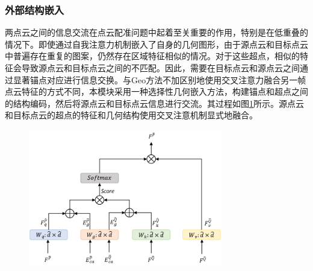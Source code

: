     \subsubsection{外部结构嵌入}
    两点云之间的信息交流在点云配准问题中起着至关重要的作用，特别是在低重叠的情况下。即使通过自我注意力机制嵌入了自身的几何图形，由于源点云和目标点云中普遍存在重复的图案，仍然存在区域特征相似的情况。对于这些超点，相似的特征会导致源点云和目标点云之间的不匹配。因此，需要在目标点云和源点云之间通过显著锚点对应进行信息交换。与Geo方法不加区别地使用交叉注意力融合另一帧点云特征的方式不同，本模块采用一种选择性几何嵌入方法，构建锚点和超点之间的结构编码，然后将源点云和目标点云信息进行交流。其过程如图\ref{fig:cross_attention}所示。源点云和目标点云的超点的特征和几何结构使用交叉注意机制显式地融合。\par

    \vspace{-0.1cm}
    \begin{figure}[htp]
        \centering
        \includegraphics[width = 8.5cm]{my/figure/3-3.pdf}
        \label{fig:cross_attention}
    \end{figure}
    \vspace{-0.35cm}

